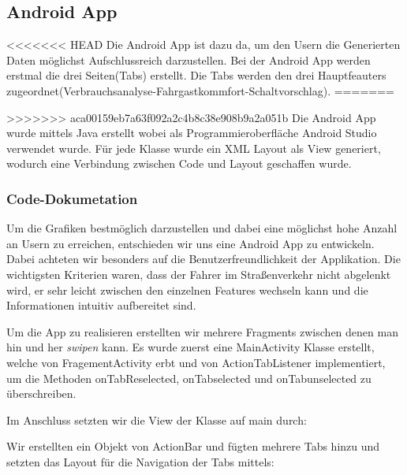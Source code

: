 \subsection{Android App}
<<<<<<< HEAD
Die Android App ist dazu da, um den Usern die Generierten Daten möglichst Aufschlussreich darzustellen.
Bei der Android App werden erstmal die drei Seiten(Tabs) erstellt. Die Tabs werden den drei Hauptfeauters zugeordnet(Verbrauchsanalyse-Fahrgastkommfort-Schaltvorschlag). 
=======
\label{subsec:androidapp}

>>>>>>> aca00159eb7a63f092a2c4b8c38e908b9a2a051b
Die Android App wurde mittels Java erstellt wobei als Programmieroberfläche Android Studio verwendet wurde.
Für jede Klasse wurde ein XML Layout als View generiert, wodurch eine Verbindung zwischen Code und Layout geschaffen wurde.

\subsubsection{Code-Dokumetation}
 Um die Grafiken bestmöglich darzustellen und dabei eine möglichst hohe Anzahl an Usern zu erreichen, entschieden wir uns eine Android App zu entwickeln.
 Dabei achteten wir besonders auf die Benutzerfreundlichkeit der Applikation.
 Die wichtigsten Kriterien waren, dass der Fahrer im Straßenverkehr nicht abgelenkt wird, er sehr leicht zwischen den einzelnen Features wechseln kann und die Informationen intuitiv aufbereitet sind.
 
 Um die App zu realisieren erstellten wir mehrere Fragments zwischen denen man hin und her \textit{swipen} kann.
  Es wurde zuerst eine MainActivity Klasse erstellt, welche von FragementActivity erbt und von ActionTabListener implementiert, um die Methoden onTabReselected, onTabselected und onTabunselected zu überschreiben. 



  
 
            
Im Anschluss setzten wir die View der Klasse auf main durch:  



Wir erstellten ein Objekt von ActionBar und fügten mehrere Tabs hinzu und setzten das Layout für die Navigation der Tabs mittels:



